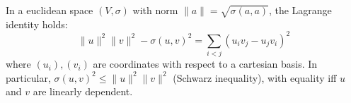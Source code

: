 In a euclidean space $(V, \sigma)$ with norm $\|a\| = \sqrt{\sigma(a,a)}$, the Lagrange identity holds:
$$\|u\|^2 \|v\|^2 - \sigma(u,v)^2 = \sum_{i<j} (u_i v_j - u_j v_i)^2$$
where $(u_i), (v_i)$ are coordinates with respect to a cartesian basis. In particular, $\sigma(u,v)^2 \leq \|u\|^2 \|v\|^2$ (Schwarz inequality), with equality iff $u$ and $v$ are linearly dependent.

